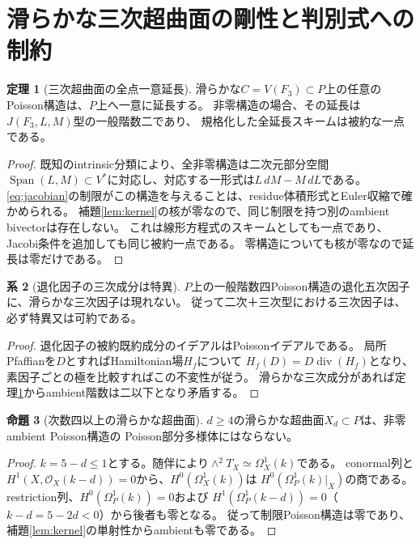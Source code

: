 \documentclass[a4paper,11pt]{ltjsarticle}
\theoremstyle{definition}
\newtheorem{theorem}{定理}[section]
\newtheorem{proposition}[theorem]{命題}
\newtheorem{corollary}[theorem]{系}
\theoremstyle{definition}\newtheorem{definition}[theorem]{定義}
\theoremstyle{remark}\newtheorem{remark}[theorem]{注意}
\newcommand{\cO}{\mathcal O}\newcommand{\cE}{\mathcal E}\newcommand{\Pf}{\operatorname{Pf}}
\newcommand{\Div}{\operatorname{div}}\newcommand{\Span}{\operatorname{Span}}
\begin{document}
\section{滑らかな三次超曲面の剛性と判別式への制約}
\begin{theorem}[三次超曲面の全点一意延長]\label{thm:cubic}
滑らかな$C=V(F_3)\subset P$上の任意のPoisson構造は、$P$上へ一意に延長する。
非零構造の場合、その延長は$J(F_3,L,M)$型の一般階数二であり、
規格化した全延長スキームは被約な一点である。
\end{theorem}
\begin{proof}
既知のintrinsic分類\cite{LPT,May}により、全非零構造は二次元部分空間
$\Span(L,M)\subset V^*$に対応し、対応する一形式は$L\,dM-M\,dL$である。
\eqref{eq:jacobian}の制限がこの構造を与えることは、residue体積形式とEuler収縮で確かめられる。
補題\ref{lem:kernel}の核が零なので、同じ制限を持つ別のambient bivectorは存在しない。
これは線形方程式のスキームとしても一点であり、Jacobi条件を追加しても同じ被約一点である。
零構造についても核が零なので延長は零だけである。
\end{proof}

\begin{corollary}[退化因子の三次成分は特異]\label{cor:cubic-discriminant}
$P$上の一般階数四Poisson構造の退化五次因子に、滑らかな三次因子は現れない。
従って二次＋三次型における三次因子は、必ず特異又は可約である。
\end{corollary}
\begin{proof}
退化因子の被約既約成分のイデアルはPoissonイデアルである。
局所Pfaffianを$D$とすればHamiltonian場$H_f$について
$H_f(D)=D\Div(H_f)$となり、素因子ごとの極を比較すればこの不変性が従う。
滑らかな三次成分があれば定理\ref{thm:cubic}からambient階数は二以下となり矛盾する。
\end{proof}

\begin{proposition}[次数四以上の滑らかな超曲面]\label{prop:higher}
$d\ge4$の滑らかな超曲面$X_d\subset P$は、非零ambient Poisson構造の
Poisson部分多様体にはならない。
\end{proposition}
\begin{proof}
$k=5-d\le1$とする。随伴により$\wedge^2T_X\simeq\Omega_X^1(k)$である。
conormal列と$H^1(X,\cO_X(k-d))=0$から、$H^0(\Omega_X^1(k))$は
$H^0(\Omega_P^1(k)|_X)$の商である。
restriction列、$H^0(\Omega_P^1(k))=0$および
$H^1(\Omega_P^1(k-d))=0$（$k-d=5-2d<0$）から後者も零となる。
従って制限Poisson構造は零であり、補題\ref{lem:kernel}の単射性からambientも零である。
\end{proof}
\end{document}
